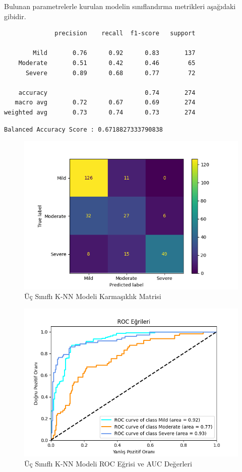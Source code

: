 \documentclass[12pt,twoside]{deuthesis}
\begin{document}
Bulunan parametrelerle kurulan modelin sınıflandırma metrikleri aşağıdaki gibidir.
\begin{verbatim}
              precision    recall  f1-score   support

        Mild       0.76      0.92      0.83       137
    Moderate       0.51      0.42      0.46        65
      Severe       0.89      0.68      0.77        72

    accuracy                           0.74       274
   macro avg       0.72      0.67      0.69       274
weighted avg       0.73      0.74      0.73       274
\end{verbatim}
\begin{verbatim}
Balanced Accuracy Score : 0.6718827333790838
\end{verbatim}
\begin{figure}

{\centering \includegraphics[width=1.05\linewidth,height=0.6\textheight]{figure/knn_conf} 

}

\caption{Üç Sınıflı K-NN Modeli Karmaşıklık Matrisi}\label{fig:unnamed-chunk-24}
\end{figure}
\begin{figure}

{\centering \includegraphics[width=1.05\linewidth,height=0.6\textheight]{figure/roc_curve_KNeighborsClassifier} 

}

\caption{Üç Sınıflı K-NN Modeli ROC Eğrisi ve AUC Değerleri}\label{fig:unnamed-chunk-25}
\end{figure}
\end{document}
